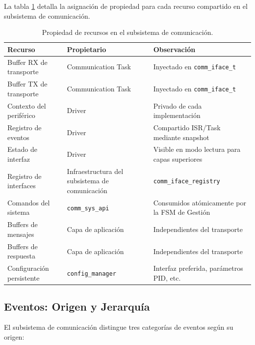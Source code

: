La tabla \ref{tab:propiedad-recursos} detalla la asignación de propiedad para cada recurso compartido en el subsistema de comunicación.

\begin{table}[htbp]
    \centering
    \caption{Propiedad de recursos en el subsistema de comunicación.}
    \label{tab:propiedad-recursos}
    \begin{tabular}{lll}
        \toprule
        \textbf{Recurso} & \textbf{Propietario} & \textbf{Observación} \\
        \midrule
        Buffer RX de transporte & Communication Task & Inyectado en \texttt{comm\_iface\_t} \\
        Buffer TX de transporte & Communication Task & Inyectado en \texttt{comm\_iface\_t} \\
        Contexto del periférico  & Driver              & Privado de cada implementación \\
        Registro de eventos      & Driver              & Compartido ISR/Task mediante snapshot \\
        Estado de interfaz       & Driver              & Visible en modo lectura para capas superiores \\
        Registro de interfaces   & Infraestructura del subsistema de comunicación & \texttt{comm\_iface\_registry} \\
        Comandos del sistema     & \texttt{comm\_sys\_api} & Consumidos atómicamente por la FSM de Gestión \\
        Buffers de mensajes      & Capa de aplicación   & Independientes del transporte \\
        Buffers de respuesta     & Capa de aplicación   & Independientes del transporte \\
        Configuración persistente& \texttt{config\_manager} & Interfaz preferida, parámetros PID, etc. \\
        \bottomrule
    \end{tabular}
\end{table}

\subsection{Eventos: Origen y Jerarquía}
\label{subsec:eventos-origen}

El subsistema de comunicación distingue tres categorías de eventos según su origen:

